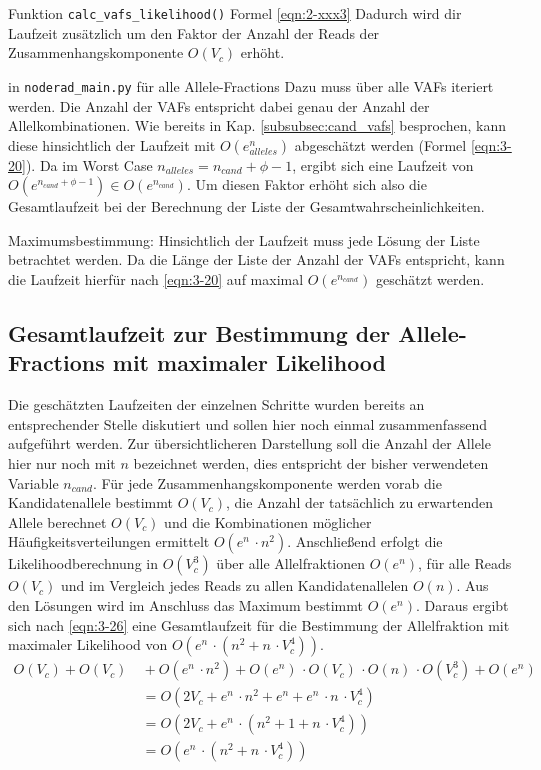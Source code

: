 Funktion \lstinline|calc_vafs_likelihood()| Formel \eqref{eqn:2-xxx3}
Dadurch wird dir Laufzeit zusätzlich um den Faktor der Anzahl der Reads der Zusammenhangskomponente $ O(V_{c}) $ erhöht.

in \lstinline|noderad_main.py| für alle Allele-Fractions
Dazu muss über alle VAFs iteriert werden. Die Anzahl der VAFs entspricht dabei genau der Anzahl der Allelkombinationen. Wie bereits in Kap. \ref{subsubsec:cand_vafs} besprochen, kann diese hinsichtlich der Laufzeit mit $ O(e^n_{alleles}) $ abgeschätzt werden (Formel \eqref{eqn:3-20}). Da im Worst Case $n_{alleles} = n_{cand} + \phi - 1$, ergibt sich eine Laufzeit von $ O(e^{n_{cand} + \phi - 1}) \in O(e^{n_{cand}}) $. Um diesen Faktor erhöht sich also die Gesamtlaufzeit bei der Berechnung der Liste der Gesamtwahrscheinlichkeiten.

Maximumsbestimmung: 
Hinsichtlich der Laufzeit muss jede Lösung der Liste betrachtet werden. Da die Länge der Liste der Anzahl der VAFs entspricht, kann die Laufzeit hierfür nach \eqref{eqn:3-20} auf maximal $ O(e^{n_{cand}}) $ geschätzt werden.


\subsection{Gesamtlaufzeit zur Bestimmung der Allele-Fractions mit maximaler Likelihood} \label{subsec:al_compl}
Die geschätzten Laufzeiten der einzelnen Schritte wurden bereits an entsprechender Stelle diskutiert und sollen hier noch einmal zusammenfassend aufgeführt werden. Zur übersichtlicheren Darstellung soll die Anzahl der Allele hier nur noch mit $n$ bezeichnet werden, dies entspricht der bisher verwendeten Variable $n_{cand}$. Für jede Zusammenhangskomponente werden vorab die Kandidatenallele bestimmt $ O(V_{c}) $, die Anzahl der tatsächlich zu erwartenden Allele berechnet $ O(V_{c}) $ und die Kombinationen möglicher Häufigkeitsverteilungen ermittelt $ O(e^{n} \, \cdotp n^2) $. Anschließend erfolgt die Likelihoodberechnung in $ O(V_{c}^3) $ über alle Allelfraktionen $ O(e^{n}) $, für alle Reads $ O(V_{c}) $ und im Vergleich jedes Reads zu allen Kandidatenallelen $ O(n) $. Aus den Lösungen wird im Anschluss das Maximum bestimmt $ O(e^{n}) $. Daraus ergibt sich nach \ref{eqn:3-26} eine Gesamtlaufzeit für die Bestimmung der Allelfraktion mit maximaler Likelihood von $ O(e^n \, \cdotp (n^2 + n \, \cdotp V_{c}^4)) $. 
\begin{equation} \label{eqn:3-26}
\tag{3-26}
\begin{aligned}
O(V_{c}) +  O(V_{c}) &\ {} + O(e^n \, \cdotp n^2) + O(e^n) \, \cdotp O(V_{c}) \, \cdotp O(n) \, \cdotp O(V_{c}^3) + O(e^n)\\
&\ =  O(2 V_{c} + e^n \, \cdotp n^2 + e^n + e^n \, \cdotp n \, \cdotp V_{c}^4)\\
&\ = O(2 V_{c} + e^n \, \cdotp (n^2 + 1 + n \, \cdotp V_{c}^4))\\
&\ = O(e^n \, \cdotp (n^2 + n \, \cdotp V_{c}^4)) \\
\end{aligned}
\end{equation}

